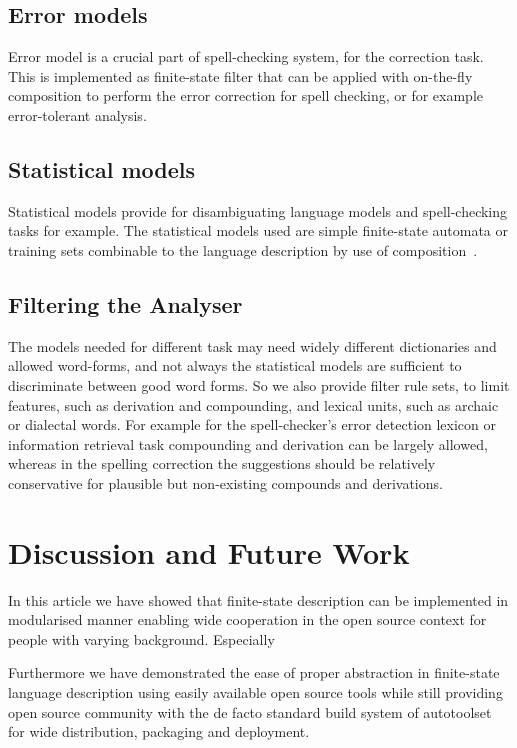 \documentclass[11pt]{article}
\begin{document}
\subsection{Error models}

Error model is a crucial part of spell-checking system, for the correction
task. This is implemented as finite-state filter that can be 
applied with on-the-fly composition \cite{pirinen/2010/cla} to perform the
error correction for spell checking, or for example error-tolerant analysis.

\subsection{Statistical models}

Statistical models provide for disambiguating language models and spell-checking
tasks for example. The statistical models used are simple finite-state automata
or training sets combinable to the language description by use of 
composition~\cite{linden/2009/nodalida,linden/2009/fsmnlp}. 

\subsection{Filtering the Analyser}

The models needed for different task may need widely different dictionaries and
allowed word-forms, and not always the statistical models are sufficient to
discriminate between good word forms. So we also provide filter rule sets, to
limit features, such as derivation and compounding, and lexical units, such as
archaic or dialectal words. For example for the spell-checker's error detection
lexicon or information retrieval task compounding and derivation can be largely
allowed, whereas in the spelling correction the suggestions should be relatively
conservative for plausible but non-existing compounds and derivations.

\section{Discussion and Future Work}

In this article we have showed that finite-state description can be implemented
in modularised manner enabling wide cooperation in the open source context for
people with varying background. Especially

Furthermore we have demonstrated the ease of
proper abstraction in finite-state language description using easily available
open source tools while still providing open source community with the de facto
standard build system of autotoolset for wide distribution, packaging and
deployment.
\end{document}
